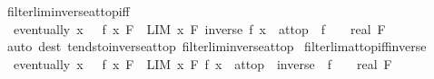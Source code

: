 \begin{isabellebody}
\endisatagproof
{\isafoldproof}%
%
\isadelimproof
\isanewline
%
\endisadelimproof
\isanewline
{}\isamarkupfalse%
\ filterlim{\isacharunderscore}{\kern0pt}inverse{\isacharunderscore}{\kern0pt}at{\isacharunderscore}{\kern0pt}top{\isacharunderscore}{\kern0pt}iff{\isacharcolon}{\kern0pt}\isanewline
\ \ {\isachardoublequoteopen}eventually\ {\isacharparenleft}{\kern0pt}{\isasymlambda}x{\isachardot}{\kern0pt}\ {}\ {\isacharless}{\kern0pt}\ f\ x{\isacharparenright}{\kern0pt}\ F\ {\isasymLongrightarrow}\ {\isacharparenleft}{\kern0pt}LIM\ x\ F{\isachardot}{\kern0pt}\ inverse\ {\isacharparenleft}{\kern0pt}f\ x{\isacharparenright}{\kern0pt}\ {\isacharcolon}{\kern0pt}{\isachargreater}{\kern0pt}\ at{\isacharunderscore}{\kern0pt}top{\isacharparenright}{\kern0pt}\ {\isasymlongleftrightarrow}\ {\isacharparenleft}{\kern0pt}f\ {\isasymlonglongrightarrow}\ {\isacharparenleft}{\kern0pt}{}\ {\isacharcolon}{\kern0pt}{\isacharcolon}{\kern0pt}\ real{\isacharparenright}{\kern0pt}{\isacharparenright}{\kern0pt}\ F{\isachardoublequoteclose}\isanewline
%
\isadelimproof
\ \ %
\endisadelimproof
%
\isatagproof
{}\isamarkupfalse%
\ {\isacharparenleft}{\kern0pt}auto\ dest{\isacharcolon}{\kern0pt}\ tendsto{\isacharunderscore}{\kern0pt}inverse{\isacharunderscore}{\kern0pt}{}{\isacharunderscore}{\kern0pt}at{\isacharunderscore}{\kern0pt}top\ filterlim{\isacharunderscore}{\kern0pt}inverse{\isacharunderscore}{\kern0pt}at{\isacharunderscore}{\kern0pt}top{\isacharparenright}{\kern0pt}%
\endisatagproof
{\isafoldproof}%
%
\isadelimproof
\isanewline
%
\endisadelimproof
\isanewline
{}\isamarkupfalse%
\ filterlim{\isacharunderscore}{\kern0pt}at{\isacharunderscore}{\kern0pt}top{\isacharunderscore}{\kern0pt}iff{\isacharunderscore}{\kern0pt}inverse{\isacharunderscore}{\kern0pt}{}{\isacharcolon}{\kern0pt}\isanewline
\ \ {\isachardoublequoteopen}eventually\ {\isacharparenleft}{\kern0pt}{\isasymlambda}x{\isachardot}{\kern0pt}\ {}\ {\isacharless}{\kern0pt}\ f\ x{\isacharparenright}{\kern0pt}\ F\ {\isasymLongrightarrow}\ {\isacharparenleft}{\kern0pt}LIM\ x\ F{\isachardot}{\kern0pt}\ f\ x\ {\isacharcolon}{\kern0pt}{\isachargreater}{\kern0pt}\ at{\isacharunderscore}{\kern0pt}top{\isacharparenright}{\kern0pt}\ {\isasymlongleftrightarrow}\ {\isacharparenleft}{\kern0pt}{\isacharparenleft}{\kern0pt}inverse\ {\isasymcirc}\ f{\isacharparenright}{\kern0pt}\ {\isasymlonglongrightarrow}\ {\isacharparenleft}{\kern0pt}{}\ {\isacharcolon}{\kern0pt}{\isacharcolon}{\kern0pt}\ real{\isacharparenright}{\kern0pt}{\isacharparenright}{\kern0pt}\ F{\isachardoublequoteclose}\isanewline

\end{isabellebody}
